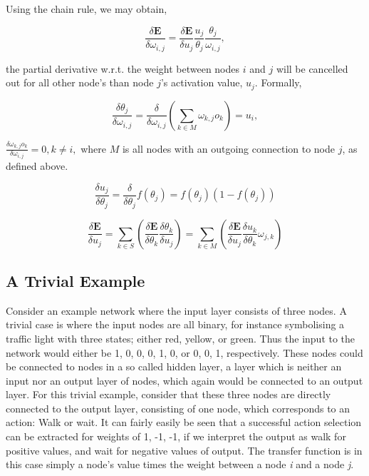 Using the chain rule, we may obtain,

\begin{equation}
    \frac{\delta \textbf{E}}{\delta \omega_{i,j}} = \frac{\delta \textbf{E}}{\delta u_j}
    \frac{u_j}{\theta_{j}}
    \frac{\theta_{j}}{\omega_{i,j}},
\end{equation}

the partial derivative w.r.t. the weight between nodes $i$ and $j$ will be cancelled out for all other node's than node $j$'s activation value, $u_j$. Formally,

\begin{equation}
    \frac{\delta \theta_j}{\delta \omega_{i,j}} = \frac{\delta}{\delta \omega_{i,j}}(\sum_{k \in M}{} \omega_{k,j}o_k) = u_i,
\end{equation}

\begin{math}
    \frac{\delta \omega_{k,j}o_k}{\delta \omega_{i,j}} = 0, k \neq i,
\end{math}
where $M$ is all nodes with an outgoing connection to node $j$, as defined above.

\begin{equation}
    \frac{\delta u_j}{\delta \theta_j} = \frac{\delta}{\delta \theta_j} f(\theta_j) = f(\theta_j)(1-f(\theta_j))
\end{equation}

\begin{equation}
    \frac{\delta \textbf{E}}{\delta u_j} = \sum_{k \in S}(\frac{\delta \textbf{E}}{\delta \theta_k} 
    \frac{\delta \theta_k}{\delta u_j})
    = \sum_{k \in M}(\frac{\delta \textbf{E}}{\delta u_j} \frac{\delta u_k}{\delta \theta_k} \omega_{j,k})
\end{equation}


\subsection{A Trivial Example}

Consider an example network where the input layer consists of three nodes. A trivial case is where the input nodes are all binary, for instance symbolising a traffic light with three states; either red, yellow, or green. Thus the input to the network would either be {1, 0, 0}, {0, 1, 0}, or {0, 0, 1}, respectively. These nodes could be connected to nodes in a so called hidden layer, a layer which is neither an input nor an output layer of nodes, which again would be connected to an output layer. For this trivial example, consider that these three nodes are directly connected to the output layer, consisting of one node, which corresponds to an action: Walk or wait. It can fairly easily be seen that a successful action selection can be extracted for weights of {1, -1, -1}, if we interpret the output as walk for positive values, and wait for negative values of output. The transfer function is in this case simply a node's value times the weight between a node \textit{i} and a node \textit{j}.

